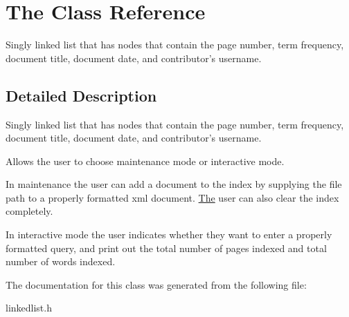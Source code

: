 \hypertarget{class_the}{\section{The Class Reference}
\label{class_the}
}


Singly linked list that has nodes that contain the page number, term frequency, document title, document date, and contributor's username.  




\subsection{Detailed Description}
Singly linked list that has nodes that contain the page number, term frequency, document title, document date, and contributor's username. 

Allows the user to choose maintenance mode or interactive mode.

In maintenance the user can add a document to the index by supplying the file path to a properly formatted xml document. \hyperlink{class_the}{The} user can also clear the index completely.

In interactive mode the user indicates whether they want to enter a properly formatted query, and print out the total number of pages indexed and total number of words indexed. 

The documentation for this class was generated from the following file\-:\begin{DoxyCompactItemize}
\item 
linkedlist.\-h\end{DoxyCompactItemize}
